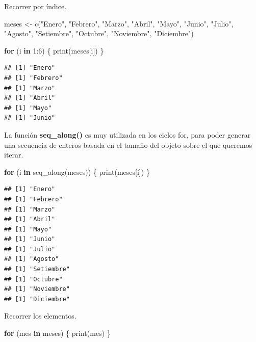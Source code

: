 \documentclass[
  12pt,
]{book}
\newenvironment{Shaded}{\begin{snugshade}}{\end{snugshade}}
\newcommand{\ControlFlowTok}[1]{\textcolor[rgb]{0.13,0.29,0.53}{\textbf{#1}}}
\newcommand{\DecValTok}[1]{\textcolor[rgb]{0.00,0.00,0.81}{#1}}
\newcommand{\FunctionTok}[1]{\textcolor[rgb]{0.00,0.00,0.00}{#1}}
\newcommand{\NormalTok}[1]{#1}
\newcommand{\OtherTok}[1]{\textcolor[rgb]{0.56,0.35,0.01}{#1}}
\newcommand{\SpecialCharTok}[1]{\textcolor[rgb]{0.00,0.00,0.00}{#1}}
\newcommand{\StringTok}[1]{\textcolor[rgb]{0.31,0.60,0.02}{#1}}
\begin{document}
Recorrer por índice.

\begin{Shaded}
\begin{Highlighting}[]
\NormalTok{meses }\OtherTok{\textless{}{-}} \FunctionTok{c}\NormalTok{(}\StringTok{"Enero"}\NormalTok{, }\StringTok{"Febrero"}\NormalTok{, }\StringTok{"Marzo"}\NormalTok{, }\StringTok{"Abril"}\NormalTok{, }\StringTok{"Mayo"}\NormalTok{, }\StringTok{"Junio"}\NormalTok{, }\StringTok{"Julio"}\NormalTok{, }\StringTok{"Agosto"}\NormalTok{, }\StringTok{"Setiembre"}\NormalTok{, }\StringTok{"Octubre"}\NormalTok{, }\StringTok{"Noviembre"}\NormalTok{, }\StringTok{"Diciembre"}\NormalTok{)}

\ControlFlowTok{for}\NormalTok{ (i }\ControlFlowTok{in} \DecValTok{1}\SpecialCharTok{:}\DecValTok{6}\NormalTok{) \{}
  \FunctionTok{print}\NormalTok{(meses[i])}
\NormalTok{\}}
\end{Highlighting}
\end{Shaded}

\begin{verbatim}
## [1] "Enero"
## [1] "Febrero"
## [1] "Marzo"
## [1] "Abril"
## [1] "Mayo"
## [1] "Junio"
\end{verbatim}

La función \textbf{seq\_along()} es muy utilizada en los ciclos for, para poder generar una secuencia de enteros basada en el tamaño del objeto sobre el que queremos iterar.

\begin{Shaded}
\begin{Highlighting}[]
\ControlFlowTok{for}\NormalTok{ (i }\ControlFlowTok{in} \FunctionTok{seq\_along}\NormalTok{(meses)) \{}
  \FunctionTok{print}\NormalTok{(meses[i])}
\NormalTok{\}}
\end{Highlighting}
\end{Shaded}

\begin{verbatim}
## [1] "Enero"
## [1] "Febrero"
## [1] "Marzo"
## [1] "Abril"
## [1] "Mayo"
## [1] "Junio"
## [1] "Julio"
## [1] "Agosto"
## [1] "Setiembre"
## [1] "Octubre"
## [1] "Noviembre"
## [1] "Diciembre"
\end{verbatim}

Recorrer los elementos.

\begin{Shaded}
\begin{Highlighting}[]
\ControlFlowTok{for}\NormalTok{ (mes }\ControlFlowTok{in}\NormalTok{ meses) \{}
  \FunctionTok{print}\NormalTok{(mes)}
\NormalTok{\}}
\end{Highlighting}
\end{Shaded}
\end{document}
